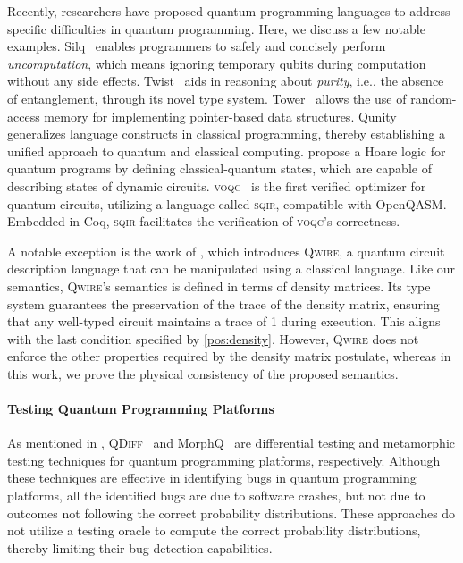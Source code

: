Recently, researchers have proposed quantum programming languages to address
specific difficulties in quantum programming.
%
Here, we discuss a few notable examples.
%
Silq~\cite{bichsel2020silq} enables programmers to safely and concisely perform
\emph{uncomputation}, which means ignoring temporary qubits during computation
without any side effects.
%
Twist~\cite{yuan2022twist} aids in reasoning about \emph{purity}, i.e., the
absence of entanglement, through its novel type system.
%
Tower~\cite{yuan2022tower} allows the use of random-access memory for
implementing pointer-based data structures.
%
Qunity~\cite{voichick2023qunity} generalizes language constructs in classical
programming, thereby establishing a unified approach to quantum and classical
computing.
%
\citet{Feng2021Hoare} propose a Hoare logic for quantum programs by defining
classical-quantum states, which are capable of describing states of dynamic
circuits.
%
\textsc{voqc}~\cite{Hietala2021voqc} is the first verified optimizer for quantum
circuits, utilizing a language called \textsc{sqir}, compatible with OpenQASM.
%
Embedded in Coq, \textsc{sqir} facilitates the verification of \textsc{voqc}'s
correctness.

A notable exception is the work of \citet{paykin2017qwire}, which introduces
\textsc{Qwire}, a quantum circuit description language that can be manipulated
using a classical language.
%
Like our semantics, \textsc{Qwire}'s semantics is defined in terms of density
matrices.
%
Its type system guarantees the preservation of the trace of the density matrix,
ensuring that any well-typed circuit maintains a trace of 1 during execution.
%
This aligns with the last condition specified by \cref{pos:density}.
%
However, \textsc{Qwire} does not enforce the other properties required by the
density matrix postulate, whereas in this work, we prove the physical
consistency of the proposed semantics.

\paragraph{Testing Quantum Programming Platforms}

As mentioned in , \textsc{QDiff}~\cite{wang2022qdiff}
and MorphQ~\cite{paltenghi2023morphq} are differential testing and metamorphic
testing techniques for quantum programming platforms, respectively.
%
Although these techniques are effective in identifying bugs in quantum
programming platforms, all the identified bugs are due to software crashes, but
not due to outcomes not following the correct probability distributions.
%
These approaches do not utilize a testing oracle to compute the correct
probability distributions, thereby limiting their bug detection capabilities.